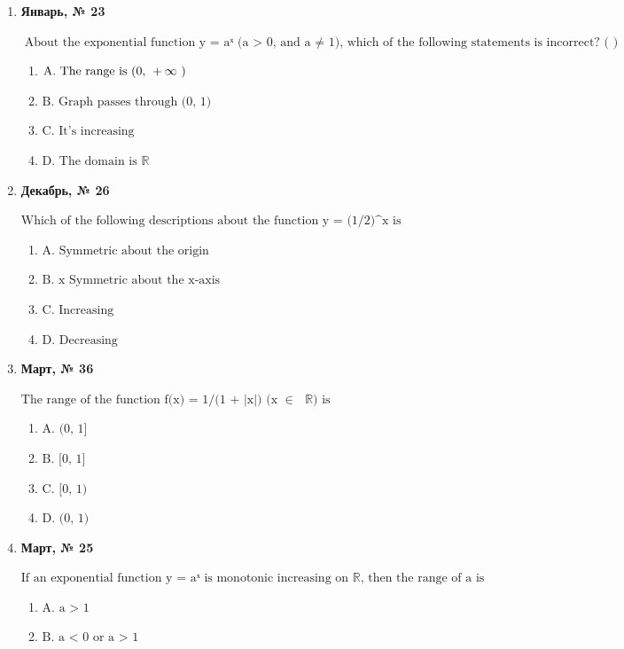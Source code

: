 \begin{enumerate}
\begin{enumerate}
\end{enumerate}
\item \textbf{Январь, № 23} \par \smallskip
$\displaystyle \text{About the exponential function y = aˣ (a > 0, and a }\neq\text{  1), which of the following statements is incorrect? ( )}$
\begin{enumerate}
\item $\displaystyle \text{A.   The range is (0, }+\infty\text{ )}$
\item $\displaystyle \text{B.  Graph passes through (0, 1)}$
\item $\displaystyle \text{C.   It's increasing}$
\item $\displaystyle \text{D.  The domain is }\mathbb{R}$
\end{enumerate}
\item \textbf{Декабрь, № 26} \par \smallskip
$\displaystyle \text{Which of the following descriptions about the function y = (1/2)^x is correct?}$
\begin{enumerate}
\item $\displaystyle \text{A.  Symmetric about the origin}$
\item $\displaystyle \text{B. x Symmetric about the x-axis}$
\item $\displaystyle \text{C.  Increasing}$
\item $\displaystyle \text{D.  Decreasing}$
\end{enumerate}
\item \textbf{Март, № 36} \par \smallskip
$\displaystyle \text{The range of the function f(x) = 1/(1 + |x|) (x }\in\text{  }\mathbb{R}\text{) is}$
\begin{enumerate}
\item $\displaystyle \text{A. (0, 1]}$
\item $\displaystyle \text{B. [0, 1]}$
\item $\displaystyle \text{C. [0, 1)}$
\item $\displaystyle \text{D. (0, 1)}$
\end{enumerate}
\item \textbf{Март, № 25} \par \smallskip
$\displaystyle \text{If an exponential function y = aˣ is monotonic increasing on }\mathbb{R}\text{, then the range of a is}$
\begin{enumerate}
\item $\displaystyle \text{A. a > 1}$
\item $\displaystyle \text{B. a < 0 or a > 1}$

\end{enumerate}
\end{enumerate}
